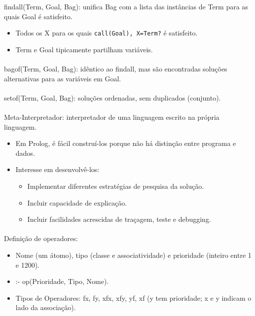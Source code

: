 \documentclass[../resumosPLOG.tex]{subfiles}
\begin{document}
 

findall(Term, Goal, Bag): unifica Bag com a lista das instâncias de Term para as quais Goal é satisfeito.
\begin{itemize}
    \item Todos os X para os quais \lstinline{call(Goal), X=Term?} é satisfeito.
    \item Term e Goal tipicamente partilham variáveis.
\end{itemize}

\paragraph{}

bagof(Term, Goal, Bag): idêntico ao findall, mas são encontradas soluções alternativas para as variáveis em Goal.

\paragraph{}

setof(Term, Goal, Bag): soluções ordenadas, sem duplicados (conjunto).

\paragraph{}

Meta-Interpretador: interpretador de uma linguagem escrito na própria linguagem.
\begin{itemize}
    \item Em Prolog, é fácil construí-los porque não há distinção entre programa e dados.
    \item Interesse em desenvolvê-los:
    \begin{itemize}
        \item Implementar diferentes estratégias de pesquisa da solução.
        \item Incluir capacidade de explicação.
        \item Incluir facilidades acrescidas de traçagem, teste e debugging.
    \end{itemize}
\end{itemize}

\paragraph{}

Definição de operadores:
\begin{itemize}
    \item Nome (um átomo), tipo (classe e associatividade) e prioridade (inteiro entre 1 e 1200).
    \item :- op(Prioridade, Tipo, Nome).
    \item Tipos de Operadores: fx, fy, xfx, xfy, yf, xf (y tem prioridade; x e y indicam o lado da associação).
\end{itemize}
\end{document}
